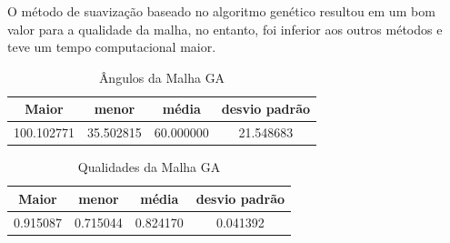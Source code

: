 O método de suavização baseado no algoritmo genético resultou em um bom valor para a qualidade da malha, no entanto, foi inferior aos outros métodos e teve um tempo computacional maior.

\begin{table}[hb]
\centering
\par\caption{Ângulos da Malha GA}
\begin{tabular}{c|c|c|c}
Maior&menor&média&desvio padrão\\\hline\hline
100.102771&35.502815&60.000000&21.548683\\\hline
\end{tabular}
\label{tab:angulos-malha-ga}
\end{table}

\begin{table}[hb]
\centering
\par\caption{Qualidades da Malha GA}
\begin{tabular}{c|c|c|c}
Maior&menor&média&desvio padrão\\\hline\hline
0.915087&0.715044&0.824170&0.041392\\\hline
\end{tabular}
\label{tab:qualidades-malha-ga}
\end{table}